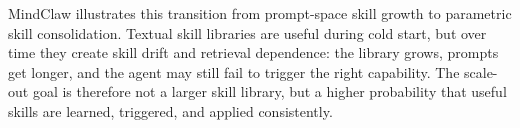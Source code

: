 MindClaw \citep{li2026mindclaw} illustrates this transition from prompt-space skill growth to parametric skill consolidation. Textual skill libraries are useful during cold start, but over time they create skill drift and retrieval dependence: the library grows, prompts get longer, and the agent may still fail to trigger the right capability. The scale-out goal is therefore not a larger skill library, but a higher probability that useful skills are learned, triggered, and applied consistently.





